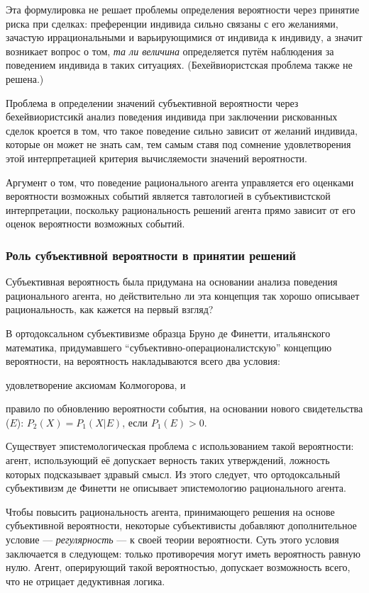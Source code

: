 \documentclass[14pt]{extarticle}
\begin{document}
Эта формулировка не решает проблемы определения вероятности через принятие риска при сделках: преференции индивида сильно связаны с его желаниями, зачастую иррациональными и варьирующимися от индивида к индивиду, а значит возникает вопрос о том, \emph{та ли величина} определяется путём наблюдения за поведением индивида в таких ситуациях. (Бехейвиористская проблема также не решена.)

Проблема в определении значений субъективной вероятности через бехейвиористсикй анализ поведения индивида при заключении рискованных сделок кроется в том, что такое поведение сильно зависит от желаний индивида, которые он может не знать сам, тем самым ставя под сомнение удовлетворения этой интерпретацией критерия вычисляемости значений вероятности.

Аргумент о том, что поведение рационального агента управляется его оценками вероятности возможных событий является тавтологией в субъективистской интерпретации, поскольку рациональность решений агента прямо зависит от его оценок вероятности возможных событий. 

\subsubsection{Роль субъективной вероятности в принятии решений}

Субъективная вероятность была придумана на основании анализа поведения рационального агента, но действительно ли эта концепция так хорошо описывает рациональность, как кажется на первый взгляд?

В ортодоксальном субъективизме образца Бруно де Финетти, итальянского математика, придумавшего ``субъективно-операционалистскую'' концепцию вероятности, на вероятность накладываются всего два условия:
\begin{inparaenum}[a)]
\item удовлетворение аксиомам Колмогорова, и
\item правило по обновлению вероятности события, на основании нового свидетельства ($E$): $P_2(X) = P_1(X|E)$, если $P_1(E) > 0$.
\end{inparaenum}

Существует эпистемологическая проблема с использованием такой вероятности: агент, использующий её допускает верность таких утверждений, ложность которых подсказывает здравый смысл. Из этого следует, что ортодоксальный субъективизм де Финетти не описывает эпистемологию рационального агента.

Чтобы повысить рациональность агента, принимающего решения на основе субъективной вероятности, некоторые субъективисты добавляют дополнительное условие --- \emph{регулярность} --- к своей теории вероятности. Суть этого условия заключается в следующем: только противоречия могут иметь вероятность равную нулю. Агент, оперирующий такой вероятностью, допускает возможность всего, что не отрицает дедуктивная логика. 
\end{document}
